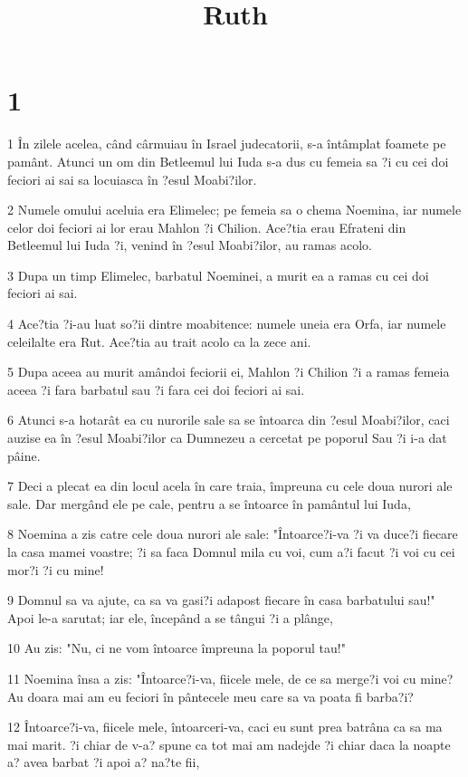 

\title{Ruth}


\chapter{1}

\par 1 În zilele acelea, când cârmuiau în Israel judecatorii, s-a întâmplat foamete pe pamânt. Atunci un om din Betleemul lui Iuda s-a dus cu femeia sa ?i cu cei doi feciori ai sai sa locuiasca în ?esul Moabi?ilor.
\par 2 Numele omului aceluia era Elimelec; pe femeia sa o chema Noemina, iar numele celor doi feciori ai lor erau Mahlon ?i Chilion. Ace?tia erau Efrateni din Betleemul lui Iuda ?i, venind în ?esul Moabi?ilor, au ramas acolo.
\par 3 Dupa un timp Elimelec, barbatul Noeminei, a murit ea a ramas cu cei doi feciori ai sai.
\par 4 Ace?tia ?i-au luat so?ii dintre moabitence: numele uneia era Orfa, iar numele celeilalte era Rut. Ace?tia au trait acolo ca la zece ani.
\par 5 Dupa aceea au murit amândoi feciorii ei, Mahlon ?i Chilion ?i a ramas femeia aceea ?i fara barbatul sau ?i fara cei doi feciori ai sai.
\par 6 Atunci s-a hotarât ea cu nurorile sale sa se întoarca din ?esul Moabi?ilor, caci auzise ea în ?esul Moabi?ilor ca Dumnezeu a cercetat pe poporul Sau ?i i-a dat pâine.
\par 7 Deci a plecat ea din locul acela în care traia, împreuna cu cele doua nurori ale sale. Dar mergând ele pe cale, pentru a se întoarce în pamântul lui Iuda,
\par 8 Noemina a zis catre cele doua nurori ale sale: "Întoarce?i-va ?i va duce?i fiecare la casa mamei voastre; ?i sa faca Domnul mila cu voi, cum a?i facut ?i voi cu cei mor?i ?i cu mine!
\par 9 Domnul sa va ajute, ca sa va gasi?i adapost fiecare în casa barbatului sau!" Apoi le-a sarutat; iar ele, începând a se tângui ?i a plânge,
\par 10 Au zis: "Nu, ci ne vom întoarce împreuna la poporul tau!"
\par 11 Noemina însa a zis: "Întoarce?i-va, fiicele mele, de ce sa merge?i voi cu mine? Au doara mai am eu feciori în pântecele meu care sa va poata fi barba?i?
\par 12 Întoarce?i-va, fiicele mele, întoarceri-va, caci eu sunt prea batrâna ca sa ma mai marit. ?i chiar de v-a? spune ca tot mai am nadejde ?i chiar daca la noapte a? avea barbat ?i apoi a? na?te fii,
